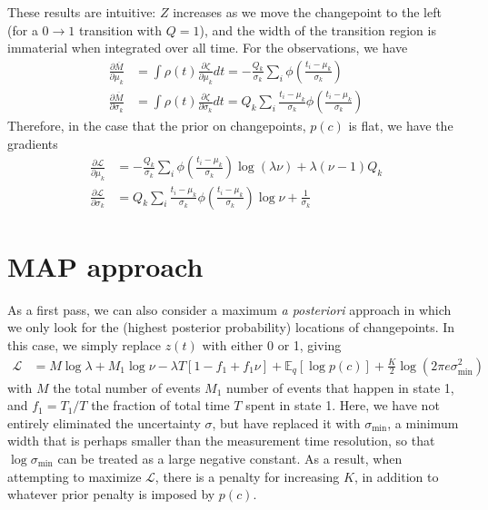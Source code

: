 \documentclass[11pt]{article}
\begin{document}
These results are intuitive: $Z$ increases as we move the changepoint to the left (for a $0 \rightarrow 1$ transition with $Q = 1$), and the width of the transition region is immaterial when integrated over all time. For the observations, we have
\begin{align}
    \frac{\partial \overline{M}}{\partial \mu_k} &= \int \rho(t) \frac{\partial \zeta}{\partial \mu_k} dt = -\frac{Q_k}{\sigma_k}\sum_i \phi\left( \frac{t_i - \mu_k}{\sigma_k}\right) \\
    \frac{\partial \overline{M}}{\partial \sigma_k} &= \int \rho(t) \frac{\partial \zeta}{\partial \sigma_k} dt = Q_k\sum_i \frac{t_i - \mu_k}{\sigma_k}\phi\left( \frac{t_i - \mu_k}{\sigma_k}\right)
\end{align}
Therefore, in the case that the prior on changepoints, $p(c)$ is flat, we have the gradients
\begin{align}
    \frac{\partial \mathcal{L}}{\partial \mu_k} &= -\frac{Q_k}{\sigma_k}\sum_i \phi\left( \frac{t_i - \mu_k}{\sigma_k}\right) \log (\lambda \nu)
    + \lambda (\nu - 1) Q_k \\
    \frac{\partial \mathcal{L}}{\partial \sigma_k} &=
    Q_k\sum_i \frac{t_i - \mu_k}{\sigma_k}\phi\left( \frac{t_i - \mu_k}{\sigma_k}\right) \log \nu + \frac{1}{\sigma_k}
\end{align}

\section{MAP approach}
As a first pass, we can also consider a maximum \emph{a posteriori} approach in which we only look for the (highest posterior probability) locations of changepoints. In this case, we simply replace $z(t)$ with either 0 or 1, giving
\begin{align}
    \mathcal{L} &= M \log \lambda + M_1 \log \nu - \lambda T [1 - f_1 + f_1 \nu] + \mathbb{E}_q[\log p(c)] + \frac{K}{2} \log (2\pi e\sigma^2_{\mathrm{min}})
\end{align}
with $M$ the total number of events $M_1$ number of events that happen in state 1, and $f_1 = T_1 / T$ the fraction of total time $T$ spent in state 1. Here, we have not entirely eliminated the uncertainty $\sigma$, but have replaced it with $\sigma_{\mathrm{min}}$, a minimum width that is perhaps smaller than the measurement time resolution, so that $\log \sigma_{\mathrm{min}}$ can be treated as a large negative constant. As a result, when attempting to maximize $\mathcal{L}$, there is a penalty for increasing $K$, in addition to whatever prior penalty is imposed by $p(c)$.
\end{document}
